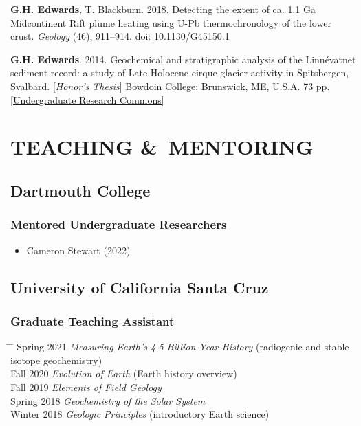 \documentclass[10pt]{article}
\newcommand{\ghedwards}{\textbf{G.H. Edwards}}
\begin{document}
\begin{etaremune} [itemsep=4pt, leftmargin=3ex]
\item \ghedwards, T. Blackburn. 2018. Detecting the extent of ca. 1.1 Ga Midcontinent Rift plume heating using U-Pb thermochronology of the lower crust. \textit{Geology} (46), 911–914. \href{https://doi.org/10.1130/G45150.1}{doi: 10.1130/G45150.1} 
\item \ghedwards. 2014. Geochemical and stratigraphic analysis of the Linnévatnet sediment record: a study of Late Holocene cirque glacier activity in Spitsbergen, Svalbard. [\textit{Honor’s Thesis}] Bowdoin College: Brunswick, ME, U.S.A. 73 pp. \href{https://digitalcommons.bowdoin.edu/honorsprojects/12/}{[Undergraduate Research Commons]}
\end{etaremune}

\vspace{2em}

\section*{TEACHING \&\ MENTORING}
\subsection*{\textbf{Dartmouth College}}
\subsubsection*{Mentored Undergraduate Researchers}
\begin{itemize}
	\item Cameron Stewart (2022)
\end{itemize}

\subsection*{\textbf{University of California Santa Cruz}}
\subsubsection*{Graduate Teaching Assistant}
\begin{tabbing} \hspace{10pt} \= \hspace{2.5cm} \=  \kill
\> Spring 2021 \> \textit{Measuring Earth’s 4.5 Billion-Year History} (radiogenic and stable isotope geochemistry)\\
\> Fall 2020 \> \textit{Evolution of Earth} (Earth history overview) \\
\> Fall 2019 \> \textit{Elements of Field Geology}\\
\> Spring 2018 \>  \textit{Geochemistry of the Solar System}\\
\> Winter 2018 \> \textit{Geologic Principles} (introductory Earth science)
\end{tabbing}
\end{document}
